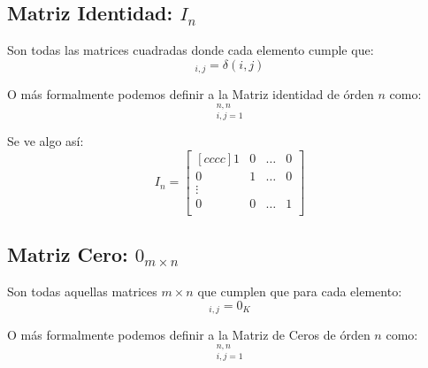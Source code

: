 \documentclass[12pt]{report}                                    %
\begin{document}
            \clearpage
            \subsection{Matriz Identidad: $I_n$}

                Son todas las matrices cuadradas donde cada elemento cumple que:
                \begin{equation}
                    [I]_{i,j} = \delta(i,j)
                \end{equation}

                O más formalmente podemos definir a la Matriz identidad de órden $n$ como:
                \begin{equation}
                    [\delta(i,j)]_{i, j = 1}^{n, n}
                \end{equation}

                Se ve algo así:
                \begin{equation*}
                    I_n =
                    \begin{bmatrix}[cccc]
                        1 & 0 & \dots & 0   \\
                        0 & 1 & \dots & 0   \\
                        \vdots              \\
                        0 & 0 & \dots & 1   \\
                    \end{bmatrix}
                \end{equation*}



            \subsection{Matriz Cero: $0_{m \times n}$}

                Son todas aquellas matrices $m \times n$ que cumplen que para cada elemento:
                \begin{equation}
                    [0]_{i,j} = 0_K
                \end{equation}

                O más formalmente podemos definir a la Matriz de Ceros de órden $n$ como:
                \begin{equation}
                    [0_{\mathbb{F}}]_{i, j = 1}^{n, n}
                \end{equation}
\end{document}
